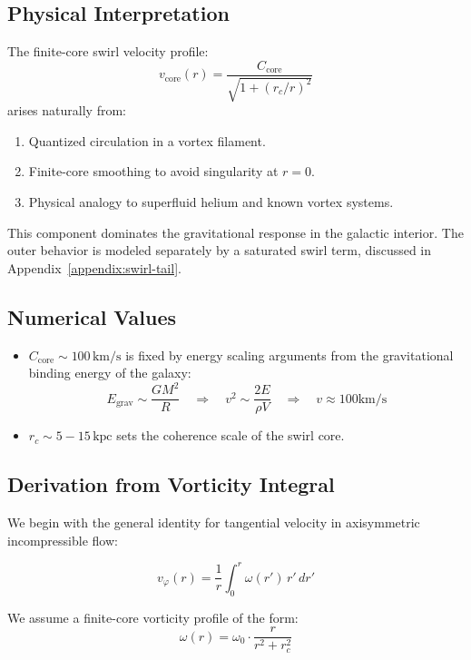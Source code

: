 \documentclass[12pt]{article}
\begin{document}
\subsection{Physical Interpretation}

The finite-core swirl velocity profile:
\[
\boxed{
v_\text{core}(r) = \frac{C_{\text{core}}}{\sqrt{1 + (r_c/r)^2}}
}
\]
arises naturally from:
\begin{enumerate}
    \item Quantized circulation in a vortex filament.
    \item Finite-core smoothing to avoid singularity at \( r = 0 \).
    \item Physical analogy to superfluid helium and known vortex systems.
\end{enumerate}

This component dominates the gravitational response in the galactic interior. The outer behavior is modeled separately by a saturated swirl term, discussed in Appendix~\ref{appendix:swirl-tail}.

\subsection{Numerical Values}

\begin{itemize}
    \item \( C_{\text{core}} \sim 100\,\text{km/s} \) is fixed by energy scaling arguments from the gravitational binding energy of the galaxy:
    \[
    E_{\text{grav}} \sim \frac{GM^2}{R} \quad \Rightarrow \quad v^2 \sim \frac{2E}{\rho V} \quad \Rightarrow \quad v \approx 100 \text{km/s}
    \]
    \item \( r_c \sim 5 - 15\,\text{kpc} \) sets the coherence scale of the swirl core.
\end{itemize}

\subsection{Derivation from Vorticity Integral}

We begin with the general identity for tangential velocity in axisymmetric incompressible flow:

\begin{equation}
    v_\varphi(r) = \frac{1}{r} \int_0^r \omega(r') \, r' \, dr'
    \label{eq:v_from_omega}
\end{equation}

We assume a finite-core vorticity profile of the form:
\begin{equation}
    \omega(r) = \omega_0 \cdot \frac{r}{r^2 + r_c^2}
    \label{eq:vorticity_profile}
\end{equation}
\end{document}
